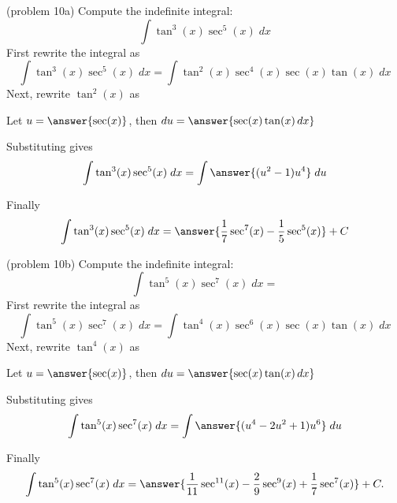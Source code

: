 \documentclass[handout]{ximera}
\begin{document}
\begin{problem}(problem 10a)
Compute the indefinite integral:
\[
\int \tan^3(x) \sec^5(x)\;dx
\]
First rewrite the integral as
\[
\int \tan^3(x) \sec^5(x)\;dx = \int \tan^2(x) \sec^4(x) \sec(x) \tan(x) \; dx
\]
Next, rewrite $\tan^2(x)$ as
\begin{multipleChoice}
\end{multipleChoice}

Let $u = \answer{\sec(x)}$, then \; $du = \answer{\sec(x) \tan(x) \, dx}$

Substituting gives
\[
\int \tan^3(x) \sec^5(x)\;dx = \int \answer{(u^2 - 1)u^4} \; du
\]

Finally
\[
\int \tan^3(x) \sec^5(x)\;dx = \answer{\frac17 \sec^7(x) - \frac15 \sec^5(x)} + C
\]
\end{problem}




\begin{problem}(problem 10b)
Compute the indefinite integral:
\[
\int \tan^5(x) \sec^7(x)\;dx = 
\]
First rewrite the integral as
\[
\int \tan^5(x) \sec^7(x)\;dx = \int \tan^4(x) \sec^6(x) \sec(x) \tan(x) \; dx
\]
Next, rewrite $\tan^4(x)$ as
\begin{multipleChoice}
\end{multipleChoice}

Let $u = \answer{\sec(x)}$, then \; $du = \answer{\sec(x) \tan(x) \, dx}$

Substituting gives
\[
\int \tan^5(x) \sec^7(x)\;dx = \int \answer{(u^4 -2u^2 + 1) u^6} \; du
\]

Finally
\[
\int \tan^5(x) \sec^7(x)\;dx =  \answer{\frac{1}{11} \sec^{11}(x) - \frac29 \sec^9(x) + \frac17 \sec^7(x)} + C.
\]
\end{problem}
\end{document}

